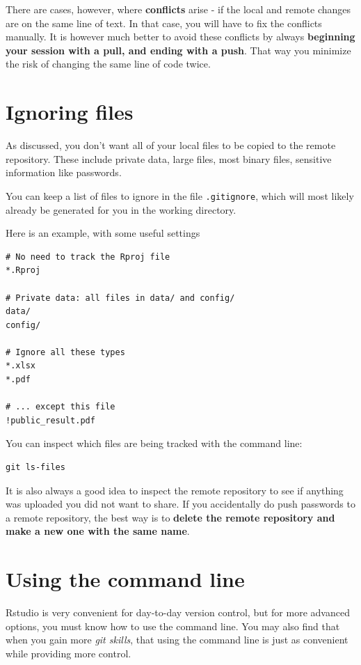 \documentclass[]{book}
\begin{document}
There are cases, however, where \textbf{conflicts} arise - if the local and remote changes are on the same line of text. In that case, you will have to fix the conflicts manually. It is however much better to avoid these conflicts by always \textbf{beginning your session with a pull, and ending with a push}. That way you minimize the risk of changing the same line of code twice.

\hypertarget{ignoring-files}{%
\section{Ignoring files}\label{ignoring-files}}

As discussed, you don't want all of your local files to be copied to the remote repository. These include private data, large files, most binary files, sensitive information like passwords.

You can keep a list of files to ignore in the file \texttt{.gitignore}, which will most likely already be generated for you in the working directory.

Here is an example, with some useful settings

\begin{verbatim}
# No need to track the Rproj file
*.Rproj

# Private data: all files in data/ and config/
data/
config/

# Ignore all these types
*.xlsx
*.pdf

# ... except this file
!public_result.pdf
\end{verbatim}

You can inspect which files are being tracked with the command line:

\begin{verbatim}
git ls-files
\end{verbatim}

It is also always a good idea to inspect the remote repository to see if anything was uploaded you did not want to share. If you accidentally do push passwords to a remote repository, the best way is to \textbf{delete the remote repository and make a new one with the same name}.

\hypertarget{commandline}{%
\section{Using the command line}\label{commandline}}

Rstudio is very convenient for day-to-day version control, but for more advanced options, you must know how to use the command line. You may also find that when you gain more \emph{git skills}, that using the command line is just as convenient while providing more control.
\end{document}
